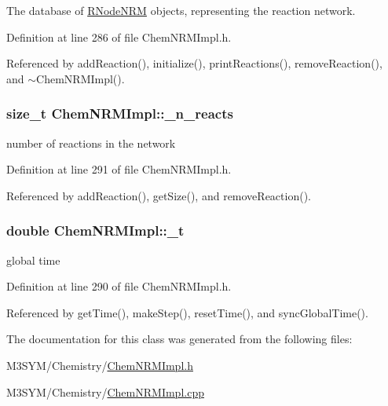 The database of \hyperlink{classRNodeNRM}{R\+Node\+N\+R\+M} objects, representing the reaction network. 



Definition at line 286 of file Chem\+N\+R\+M\+Impl.\+h.



Referenced by add\+Reaction(), initialize(), print\+Reactions(), remove\+Reaction(), and $\sim$\+Chem\+N\+R\+M\+Impl().

\hypertarget{classChemNRMImpl_acbb18690cfdd71dd4be01747aaf169d0}{
\subsubsection[{\+\_\+n\+\_\+reacts}]{\setlength{\rightskip}{0pt plus 5cm}size\+\_\+t Chem\+N\+R\+M\+Impl\+::\+\_\+n\+\_\+reacts\hspace{0.3cm}{\ttfamily [private]}}}\label{classChemNRMImpl_acbb18690cfdd71dd4be01747aaf169d0}


number of reactions in the network 



Definition at line 291 of file Chem\+N\+R\+M\+Impl.\+h.



Referenced by add\+Reaction(), get\+Size(), and remove\+Reaction().

\hypertarget{classChemNRMImpl_a87649ab485a12e3af036913033ee7ca2}{
\subsubsection[{\+\_\+t}]{\setlength{\rightskip}{0pt plus 5cm}double Chem\+N\+R\+M\+Impl\+::\+\_\+t\hspace{0.3cm}{\ttfamily [private]}}}\label{classChemNRMImpl_a87649ab485a12e3af036913033ee7ca2}


global time 



Definition at line 290 of file Chem\+N\+R\+M\+Impl.\+h.



Referenced by get\+Time(), make\+Step(), reset\+Time(), and sync\+Global\+Time().



The documentation for this class was generated from the following files\+:\begin{DoxyCompactItemize}
\item 
M3\+S\+Y\+M/\+Chemistry/\hyperlink{ChemNRMImpl_8h}{Chem\+N\+R\+M\+Impl.\+h}\item 
M3\+S\+Y\+M/\+Chemistry/\hyperlink{ChemNRMImpl_8cpp}{Chem\+N\+R\+M\+Impl.\+cpp}\end{DoxyCompactItemize}
